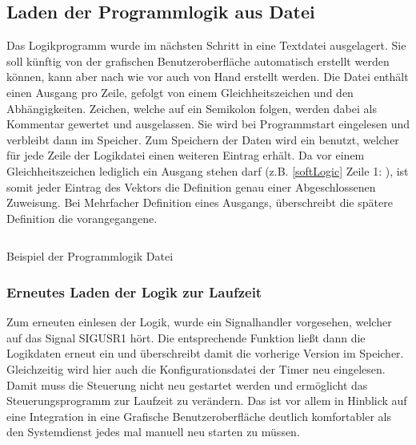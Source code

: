 \subsection{Laden der Programmlogik aus Datei}\label{kap:ums:logicOutsource}
Das Logikprogramm wurde im nächsten Schritt in eine Textdatei ausgelagert. Sie soll künftig von der grafischen Benutzeroberfläche automatisch erstellt werden können, kann aber nach wie vor auch von Hand erstellt werden. Die Datei enthält einen Ausgang pro Zeile, gefolgt von einem Gleichheitszeichen und den Abhängigkeiten. Zeichen, welche auf ein Semikolon folgen, werden dabei als Kommentar gewertet und ausgelassen. Sie wird bei Programmstart eingelesen und verbleibt dann im Speicher. Zum Speichern der Daten wird ein  benutzt, welcher für jede Zeile der Logikdatei einen weiteren Eintrag erhält. Da vor einem Gleichheitszeichen lediglich ein Ausgang stehen darf (z.B. \ref{softLogic} Zeile 1: ), ist somit jeder Eintrag des Vektors die Definition genau einer Abgeschlossenen Zuweisung. Bei Mehrfacher Definition eines Ausgangs, überschreibt die spätere Definition die vorangegangene. 

\begin{listing}[H]
	\inputminted[numbersep=1pt,fontsize=\scriptsize,frame=single, firstline=29,lastline=36]{c}{./code/logic.conf}
	\caption{Beispiel der Programmlogik Datei}
	\label{code:softLogic}
\end{listing}


\subsubsection{Erneutes Laden der Logik zur Laufzeit}\label{kap:ums:reloadConf}
Zum erneuten einlesen der Logik, wurde ein Signalhandler vorgesehen, welcher auf das Signal SIGUSR1 hört. Die entsprechende Funktion ließt dann die Logikdaten erneut ein und überschreibt damit die vorherige Version im Speicher. Gleichzeitig wird hier auch die Konfigurationsdatei der Timer neu eingelesen. Damit muss die Steuerung nicht neu gestartet werden und ermöglicht das Steuerungsprogramm zur Laufzeit zu verändern. Das ist vor allem in Hinblick auf eine Integration in eine Grafische Benutzeroberfläche deutlich komfortabler als den Systemdienst jedes mal manuell neu starten zu müssen.


